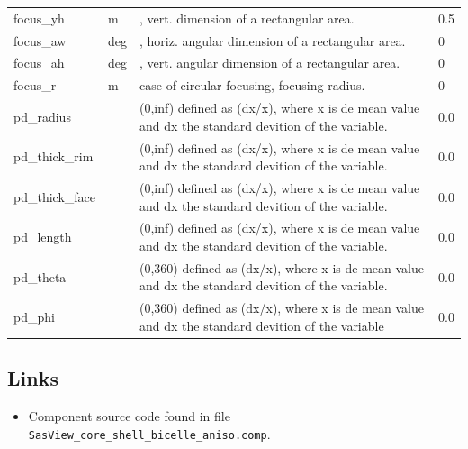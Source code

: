 \begin{longtable}{p{}p{}p{}p{}}
focus\_yh & m & , vert. dimension of a rectangular area. & 0.5 \\
focus\_aw & deg & , horiz. angular dimension of a rectangular area. & 0 \\
focus\_ah & deg & , vert. angular dimension of a rectangular area. & 0 \\
focus\_r & m & case of circular focusing, focusing radius. & 0 \\
pd\_radius &  & (0,inf) defined as (dx/x), where x is de mean value and dx the standard devition of the variable. & 0.0 \\
pd\_thick\_rim &  & (0,inf) defined as (dx/x), where x is de mean value and dx the standard devition of the variable. & 0.0 \\
pd\_thick\_face &  & (0,inf) defined as (dx/x), where x is de mean value and dx the standard devition of the variable. & 0.0 \\
pd\_length &  & (0,inf) defined as (dx/x), where x is de mean value and dx the standard devition of the variable. & 0.0 \\
pd\_theta &  & (0,360) defined as (dx/x), where x is de mean value and dx the standard devition of the variable. & 0.0 \\
pd\_phi &  & (0,360) defined as (dx/x), where x is de mean value and dx the standard devition of the variable & 0.0 \\
\bottomrule
\end{longtable}

\subsection*{Links}
\begin{itemize}
  \item Component source code found in file \texttt{SasView\_core\_shell\_bicelle\_aniso.comp}.
\end{itemize}
